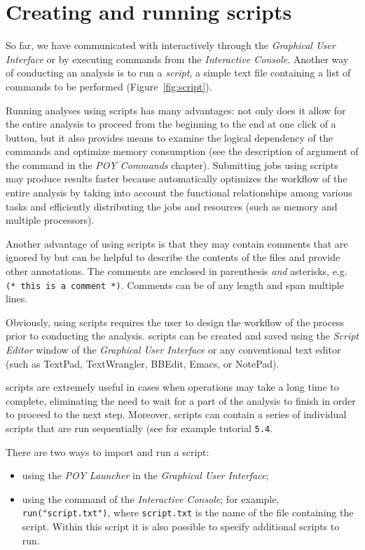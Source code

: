 {\section{Creating and running \poy scripts}

So far, we have communicated with \poy interactively through the
\emph{Graphical User Interface} or by executing commands from the
\emph{Interactive Console}. Another way of conducting an analysis
is to run a \emph{script}, a simple text file containing a list of
commands to be performed (Figure~\ref{fig:script}).

Running analyses using scripts has many advantages: not only does
it allow for the entire analysis to proceed from the beginning to
the end at one click of a button, but it also provides means to
examine the logical dependency of the commands and optimize memory
consumption (see the description of 
argument of the command  in the \emph{POY Commands}
chapter). Submitting jobs using scripts may produce results faster
because \poy automatically optimizes the workflow of the entire
analysis by taking into account the functional relationships among
various tasks and efficiently distributing the jobs and resources
(such as memory and multiple processors).

Another advantage of using scripts is that they may contain comments
that are ignored by \poy but can be helpful to describe the contents
of the files and provide other annotations. The comments are enclosed
in parenthesis \emph{and} asterisks, e.g. \texttt{(* this is a
comment *)}. Comments can be of any length and span multiple lines.

Obviously, using scripts requires the user to design the workflow
of the process prior to conducting the analysis.  \poy scripts can
be created and saved using the \emph{Script Editor} window of the
\poy \emph{Graphical User Interface} or any conventional text editor
(such as TextPad, TextWrangler, BBEdit, Emacs, or NotePad).

\poy scripts are extremely useful in cases when operations may take
a long time to complete, eliminating the need to wait for a part
of the analysis to finish in order to proceed to the next step.
Moreover, scripts can contain a series of individual scripts that 
are run sequentially (see for example tutorial \texttt{5.4}.

There are two ways to import and run a script:
\begin{itemize}
\item using the \emph{POY Launcher} in the \emph{Graphical User Interface};
\item using the command  of the \emph{Interactive Console}; 
for example, \texttt{run("script.txt")}, where \texttt{script.txt} is the name of 
the file containing the script. Within this script it is also possible to specify 
additional scripts to run.
\end{itemize}

}
